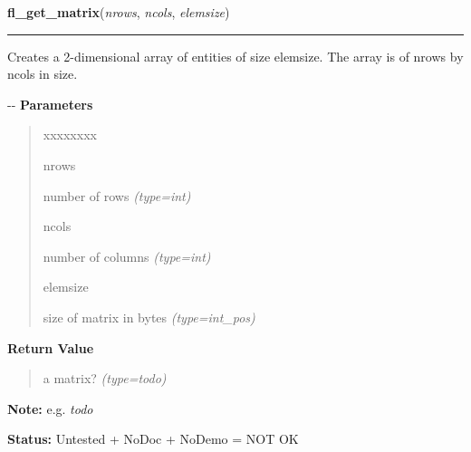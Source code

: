     \vspace{0.5ex}

\hspace{.8\funcindent}\begin{boxedminipage}{\funcwidth}

    \raggedright \textbf{fl\_get\_matrix}(\textit{nrows}, \textit{ncols}, \textit{elemsize})

    \vspace{-1.5ex}

    \rule{\textwidth}{0.5\fboxrule}
\setlength{\parskip}{2ex}

Creates a 2-dimensional array of entities of size elemsize. The array
is of nrows by ncols in size.

-{}-
\setlength{\parskip}{1ex}
      \textbf{Parameters}
      \vspace{-1ex}

      \begin{quote}
        \begin{Ventry}{xxxxxxxx}

          \item[nrows]


number of rows
            {\it (type=int)}

          \item[ncols]


number of columns
            {\it (type=int)}

          \item[elemsize]


size of matrix in bytes
            {\it (type=int\_pos)}

        \end{Ventry}

      \end{quote}

      \textbf{Return Value}
    \vspace{-1ex}

      \begin{quote}

a matrix?
      {\it (type=\emph{todo})}

      \end{quote}

\textbf{Note:} 
e.g. \emph{todo}


\textbf{Status:} 
Untested + NoDoc + NoDemo = NOT OK


    \end{boxedminipage}

    \label{xformslib:flflimage:fl_make_matrix}

